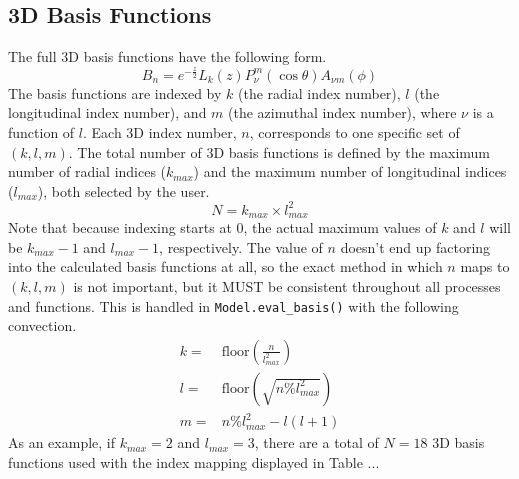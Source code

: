 \documentclass[12pt,letterpaper]{article}
\begin{document}
  \subsection{3D Basis Functions}
  The full 3D basis functions have the following form.
  \begin{equation}
    \label{eqn:basis}
    B_n = e^{-\frac{z}{2}}L_k(z)P_\nu^m(\cos\theta)A_{\nu m}(\phi)
  \end{equation}
  The basis functions are indexed by \(k\) (the radial index number), \(l\) (the longitudinal index number), and \(m\) (the azimuthal index number), where \(\nu\) is a function of \(l\).  Each 3D index number, \(n\), corresponds to one specific set of \((k,l,m)\).  The total number of 3D basis functions is defined by the maximum number of radial indices (\(k_{max}\)) and the maximum number of longitudinal indices (\(l_{max}\)), both selected by the user.
  \begin{equation}
    N = k_{max} \times l_{max}^2
  \end{equation}
  Note that because indexing starts at 0, the actual maximum values of \(k\) and \(l\) will be \(k_{max}-1\) and \(l_{max}-1\), respectively.  The value of \(n\) doesn't end up factoring into the calculated basis functions at all, so the exact method in which \(n\) maps to \((k,l,m)\) is not important, but it MUST be consistent throughout all processes and functions.  This is handled in \texttt{Model.eval\_basis()} with the following convection.
  \begin{align}
    k =& \text{floor}\left(\frac{n}{l_{max}^2}\right) \\
    l =& \text{floor}\left(\sqrt{n \% l_{max}^2}\right) \\
    m =& n \% l_{max}^2 - l(l+1)
  \end{align}
  As an example, if \(k_{max} = 2\) and \(l_{max} = 3\), there are a total of \(N = 18\) 3D basis functions used with the index mapping displayed in Table ...
\end{document}
